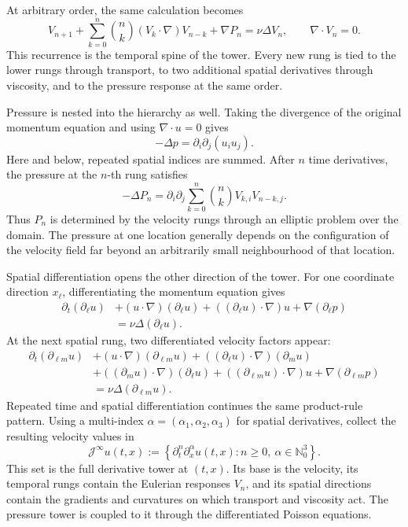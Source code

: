At arbitrary order, the same calculation becomes
\[
  V_{n+1}
  +
  \sum_{k=0}^{n}
  \binom{n}{k}
  (V_k\cdot\nabla)V_{n-k}
  +
  \nabla P_n
  =
  \nu\Delta V_n,
  \qquad
  \nabla\cdot V_n=0.
\]
This recurrence is the temporal spine of the tower.
Every new rung is tied to the lower rungs through transport, to two additional spatial derivatives through viscosity, and to the pressure response at the same order.


Pressure is nested into the hierarchy as well.
Taking the divergence of the original momentum equation and using \(\nabla\cdot u=0\) gives
\[
  -\Delta p
  =
  \partial_i\partial_j(u_i u_j).
\]
Here and below, repeated spatial indices are summed.
After \(n\) time derivatives, the pressure at the \(n\)-th rung satisfies
\[
  -\Delta P_n
  =
  \partial_i\partial_j
  \sum_{k=0}^{n}
  \binom{n}{k}
  V_{k,i}V_{n-k,j}.
\]
Thus \(P_n\) is determined by the velocity rungs through an elliptic problem over the domain.
The pressure at one location generally depends on the configuration of the velocity field far beyond an arbitrarily small neighbourhood of that location.

Spatial differentiation opens the other direction of the tower.
For one coordinate direction \(x_\ell\), differentiating the momentum equation gives
\[
  \begin{aligned}
  \partial_t(\partial_\ell u)
  &+
  (u\cdot\nabla)(\partial_\ell u)
  +
  ((\partial_\ell u)\cdot\nabla)u
  +
  \nabla(\partial_\ell p)\\
  &=
  \nu\Delta(\partial_\ell u).
  \end{aligned}
\]
At the next spatial rung, two differentiated velocity factors appear:
\[
  \begin{aligned}
  \partial_t(\partial_{\ell m}u)
  &+
  (u\cdot\nabla)(\partial_{\ell m}u)
  +
  ((\partial_\ell u)\cdot\nabla)(\partial_m u)\\
  &+
  ((\partial_m u)\cdot\nabla)(\partial_\ell u)
  +
  ((\partial_{\ell m}u)\cdot\nabla)u
  +
  \nabla(\partial_{\ell m}p)\\
  &=
  \nu\Delta(\partial_{\ell m}u).
  \end{aligned}
\]
Repeated time and spatial differentiation continues the same product-rule pattern.
Using a multi-index \(\alpha=(\alpha_1,\alpha_2,\alpha_3)\) for spatial derivatives, collect the resulting velocity values in
\[
  \mathcal J^\infty u(t,x)
  :=
  \left\{
    \partial_t^n\partial_x^\alpha u(t,x):
    n\geq 0,\ 
    \alpha\in\mathbb N_0^3
  \right\}.
\]
This set is the full derivative tower at \((t,x)\).
Its base is the velocity, its temporal rungs contain the Eulerian responses \(V_n\), and its spatial directions contain the gradients and curvatures on which transport and viscosity act.
The pressure tower is coupled to it through the differentiated Poisson equations.

